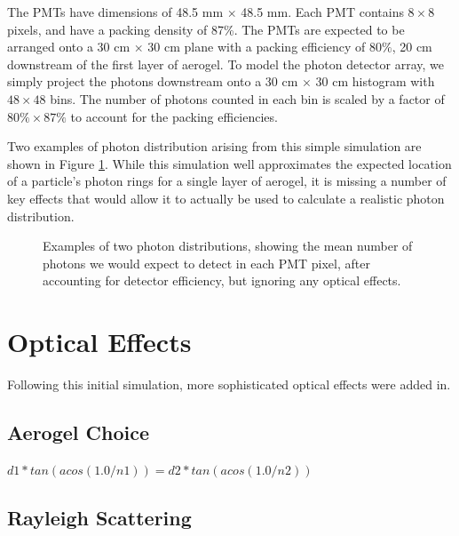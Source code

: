 The PMTs have dimensions of 48.5 mm $\times$ 48.5 mm.
Each PMT contains $8 \times 8$ pixels, and have a packing density of 87\%. 
The PMTs are expected to be arranged onto a 30 cm $\times$ 30 cm plane with a packing efficiency of $80\%$, 20 cm downstream of the first layer of aerogel.
To model the photon detector array, we simply project the photons downstream onto a 30 cm $\times$ 30 cm histogram with $48 \times 48$ bins.
The number of photons counted in each bin is scaled by a factor of $80\% \times 87\%$ to account for the packing efficiencies.

Two examples of photon distribution arising from this simple simulation are shown in Figure \ref{fig:noScat}. While this simulation well approximates the expected location of a particle's photon rings for a single layer of aerogel, it is missing a number of key effects that would allow it to actually be used to calculate a realistic photon distribution.


\begin{figure}[]
  \centering
  \hfill
  \caption{ Examples of two photon distributions, showing the mean number of photons we would expect to detect in each PMT pixel, after accounting for detector efficiency, but ignoring any optical effects. }
  \label{fig:noScat}
\end{figure}

\section{Optical Effects}
Following this initial simulation, more sophisticated optical effects were added in. 

\subsection{Aerogel Choice}

$d1*tan(acos(1.0/n1)) = d2*tan(acos(1.0/n2)) $

\subsection{Rayleigh Scattering}

